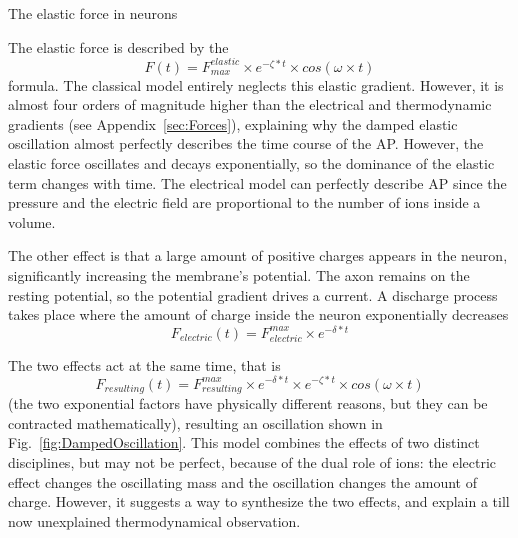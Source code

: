 \fi

\ifx\magyar\undefined

{The elastic force in neurons}
{
The elastic force is described by the  
\[
F(t) = F_{max}^{elastic}\times e^{-\zeta*t}\times cos(\omega\times t)
\]
\noindent 
formula. The classical model entirely neglects this elastic gradient. However, it is almost four orders of magnitude higher than the electrical and thermodynamic gradients (see Appendix~\ref{sec:Forces}), explaining why the damped elastic oscillation almost perfectly describes 
the time course of the \gls{AP}. However, the elastic force oscillates and decays exponentially, so the dominance of 
the elastic term changes with time.
The electrical model can perfectly describe \gls{AP} since 
the pressure and the electric field are proportional to the number of ions inside a volume.

The other effect is that a large amount of positive charges
appears in the neuron, significantly increasing the membrane's potential. The axon remains on the resting potential, so the potential gradient drives a current.
A discharge process takes place where the amount of charge
inside the neuron exponentially decreases 
\[
F_{electric}(t) = F^{max}_{electric}\times e^{-\delta*t}
\]

The two effects act at the same time, that is
\[
F_{resulting}(t) = F^{max}_{resulting}\times e^{-\delta*t}  \times e^{-\zeta*t}  \times cos(\omega\times t)
\]
(the two exponential factors have physically different reasons,
but they can be contracted mathematically), resulting
an oscillation shown in Fig.~\ref{fig:DampedOscillation}.
This model combines the effects of two distinct disciplines,
but may not be perfect, because of the dual role of ions:
the electric effect changes the oscillating mass and the oscillation changes the amount of charge. However, it 
suggests a way to synthesize the two effects, and explain 
a till now unexplained thermodynamical observation.
}

\else


